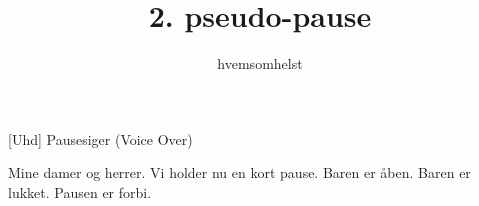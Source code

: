 \documentclass[a4paper]{article}
\title{2. pseudo-pause}
\author{hvemsomhelst}
\begin{document}
\maketitle

\begin{roles}
[Uhd] Pausesiger (Voice Over)
\end{roles}

\begin{sketch}


 Mine damer og herrer. Vi holder nu en kort pause. Baren er
åben.  Baren er lukket. Pausen er forbi.


\end{sketch}
\end{document}
